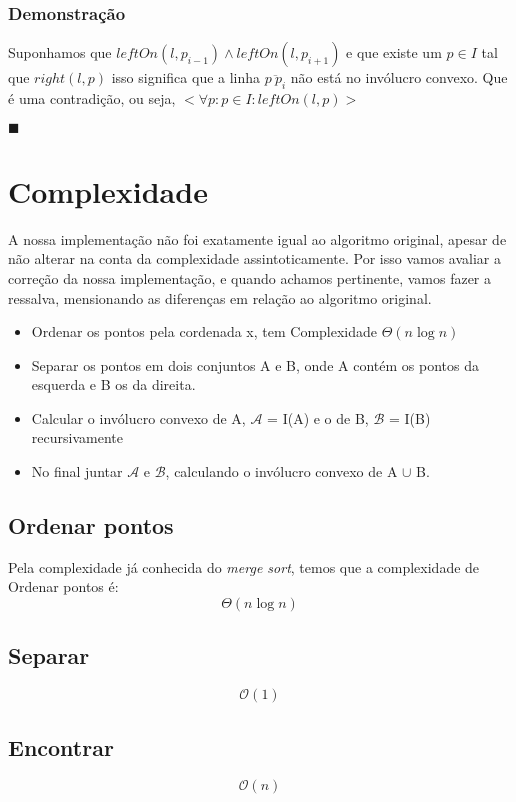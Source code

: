 \documentclass[11pt]{article}
\begin{document}
\subsubsection{Demonstração}
Suponhamos que $leftOn(l, p_{i-1}) \wedge leftOn(l, p_{i+1})$ 
e que existe um $p \in I$ tal que $right(l, p)$
isso significa que a linha $\overline{p\ p_i}$ não está no invólucro convexo.
Que é uma contradição, ou seja, $<\forall p : p \in I : leftOn(l, p)>$

\hfill $\blacksquare$


\section{Complexidade}
A nossa implementação não foi exatamente igual ao algoritmo original,
apesar de não alterar na conta da complexidade assintoticamente.
Por isso vamos avaliar a correção da nossa implementação, e quando 
achamos pertinente, vamos fazer a ressalva, mensionando as diferenças 
em relação ao algoritmo original.

\begin{itemize}
    \item Ordenar os pontos pela cordenada x, tem Complexidade $\Theta(n\log{}n)$
    \item Separar os pontos em dois conjuntos A e B, onde A contém os pontos da esquerda e B os da direita.
    \item Calcular o invólucro convexo de A, $\mathcal{A}$ = I(A) e o de B, $\mathcal{B}$ = I(B) recursivamente
    \item No final juntar $\mathcal{A}$ e $\mathcal{B}$, calculando o invólucro convexo de A $\cup$ B.
\end{itemize}

\subsection{Ordenar pontos}
Pela complexidade já conhecida do \textit{merge sort}, 
temos que a complexidade de Ordenar pontos é:
$$\Theta(n\log{}n)$$

\subsection{Separar}
$$\mathcal{O}(1)$$

\subsection{Encontrar}
$$\mathcal{O}(n)$$
\end{document}
